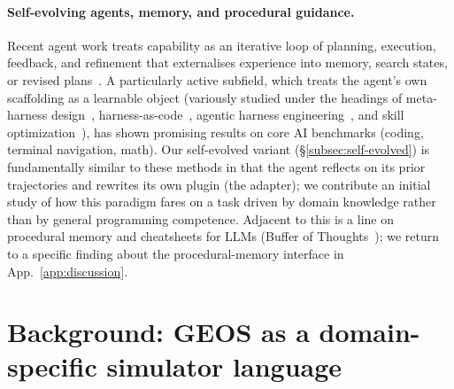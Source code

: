 \documentclass{article}
\begin{document}
\paragraph{Self-evolving agents, memory, and procedural guidance.}
Recent agent work treats capability as an iterative loop of planning, execution, feedback, and refinement that externalises experience into memory, search states, or revised plans~\citep{bran2024chemcrow,boiko2023coscientist,alber2025cellvoyager,lu2024aiscientist,zhang2026scinav,li2026agentflow,tang2026eigenagent,narayanan2024aviary}. A particularly active subfield, which treats the agent's own scaffolding as a learnable object (variously studied under the headings of meta-harness design~\cite{lee2026metaharness}, harness-as-code~\cite{ning2026codeagentharness}, agentic harness engineering~\cite{lin2026agenticharnessengineer}, and skill optimization~\cite{yang2026skillopt}), has shown promising results on core AI benchmarks (coding, terminal navigation, math). Our self-evolved variant (\S\ref{subsec:self-evolved}) is fundamentally similar to these methods in that the agent reflects on its prior trajectories and rewrites its own plugin (the adapter); we contribute an initial study of how this paradigm fares on a task driven by domain knowledge rather than by general programming competence. Adjacent to this is a line on procedural memory and cheatsheets for LLMs (Buffer of Thoughts~\cite{yang2024bot}); we return to a specific finding about the procedural-memory interface in App.~\ref{app:discussion}.


\section{Background: GEOS as a domain-specific simulator language}
\label{sec:background}
\end{document}
